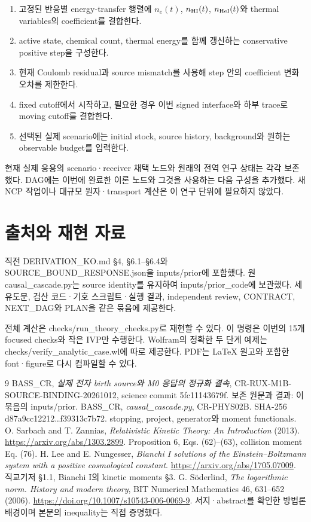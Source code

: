 \begin{enumerate}
\def\labelenumi{\arabic{enumi}.}
\tightlist
\item
  고정된 반응별 energy-transfer 행렬에 \(n_e(t)\), \(n_{\rm HI}(t)\), \(n_{\rm HeI}(t)\)와 thermal variables의 coefficient를 결합한다.
\item
  active state, chemical count, thermal energy를 함께 갱신하는 conservative positive step을 구성한다.
\item
  현재 Coulomb residual과 source mismatch를 사용해 step 안의 coefficient 변화 오차를 제한한다.
\item
  fixed cutoff에서 시작하고, 필요한 경우 이번 signed interface와 하부 trace로 moving cutoff를 결합한다.
\item
  선택된 실제 scenario에는 initial stock, source history, background와 원하는 observable budget를 입력한다.
\end{enumerate}

현재 실제 응용의 scenario·receiver 채택 노드와 원래의 전역 연구 상태는 각각 보존했다. DAG에는 이번에 완료한 이론 노드와 그것을 사용하는 다음 구성을 추가했다. 새 NCP 작업이나 대규모 원자·transport 계산은 이 연구 단위에 필요하지 않았다.

\hypertarget{uxcd9cuxcc98uxc640-uxc7acuxd604-uxc790uxb8cc}{%
\section{출처와 재현 자료}\label{uxcd9cuxcc98uxc640-uxc7acuxd604-uxc790uxb8cc}}

직전 DERIVATION\_KO.md §4, §6.1--§6.4와 SOURCE\_BOUND\_RESPONSE.json을 inputs/prior에 포함했다. 원 causal\_cascade.py는 source identity를 유지하여 inputs/prior\_code에 보관했다. 세 유도문, 검산 코드·기호 스크립트·실행 결과, independent review, CONTRACT, NEXT\_DAG와 PLAN을 같은 묶음에 제공한다.

전체 계산은 checks/run\_theory\_checks.py로 재현할 수 있다. 이 명령은 이번의 15개 focused checks와 작은 IVP만 수행한다. Wolfram의 정확한 두 단계 예제는 checks/verify\_analytic\_case.wl에 따로 제공한다. PDF는 LaTeX 원고와 포함한 font·figure로 다시 컴파일할 수 있다.

\begin{thebibliography}{9}
BASS\_CR, \emph{실제 전자 birth source와 M0 응답의 정규화 결속},
CR-RUX-M1B-SOURCE-BINDING-20261012, science commit 5fc11143679f.
보존 원문과 결과: 이 묶음의 inputs/prior.
BASS\_CR, \emph{causal\_cascade.py}, CR-PHYS02B.
SHA-256 d87a9cc12212\ldots f39313c7b72.
stopping, project, generator와 moment functionals.
O. Sarbach and T. Zannias,
\emph{Relativistic Kinetic Theory: An Introduction} (2013).
\url{https://arxiv.org/abs/1303.2899}.
Proposition 6, Eqs. (62)–(63), collision moment Eq. (76).
H. Lee and E. Nungesser,
\emph{Bianchi I solutions of the Einstein--Boltzmann system with a positive cosmological constant}.
\url{https://arxiv.org/abs/1705.07009}.
직교기저 §1.1, Bianchi I의 kinetic moments §3.
G. Söderlind,
\emph{The logarithmic norm. History and modern theory},
BIT Numerical Mathematics 46, 631--652 (2006).
\url{https://doi.org/10.1007/s10543-006-0069-9}.
서지·abstract를 확인한 방법론 배경이며 본문의 inequality는 직접 증명했다.
\end{thebibliography}
